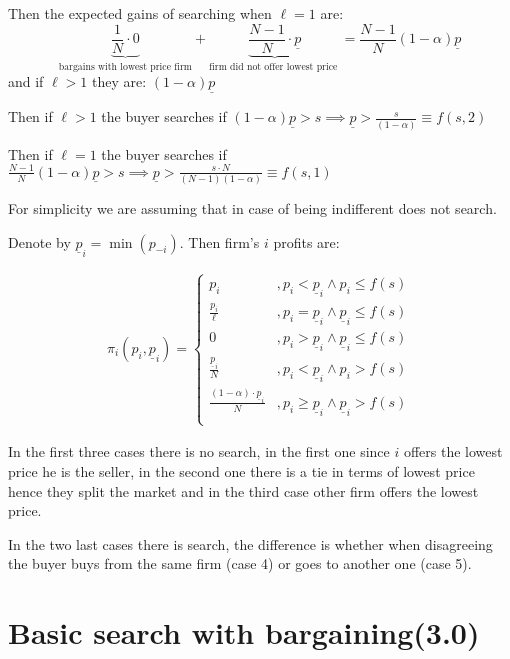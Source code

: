 \documentclass[12pt]{article}
\theoremstyle{plain}
\theoremstyle{plain}
\begin{document}
Then the expected gains of searching when $\ell =1$ are:
\[
\underbrace{\frac{1}{N} \cdot 0}_{\text{bargains with lowest price firm}} + \underbrace{\frac{N - 1}{N} \cdot \underline{p}}_{\text{firm did not offer lowest price }} = \frac{N - 1}{N}(1 - \alpha)\underline{p}
\]
and if $\ell> 1$ they are:  $ (1 - \alpha)\underline{p} $

Then if $\ell>1$ the buyer searches if $ (1 - \alpha)\underline{p}>s \implies \underline{p}>  \frac{s}{(1-\alpha)}\equiv f(s,2)$

Then if $\ell = 1$ the buyer searches if $ \frac{N - 1}{N}(1 - \alpha)\underline{p}>s \implies \underline{p}>  \frac{s\cdot N}{(N-1)(1-\alpha)}\equiv f(s,1)$

For simplicity we are assuming that in case of being indifferent does not search. 

Denote by $\underline{p}_i = \min(p_{-i})$. Then firm's $i$ profits are: 

\begin{align}
    \pi_i(p_i, \underline{p}_i ) = 
    \begin{cases}
        p_i &, p_i < \underline{p}_i \land p_i \leq f(s) \\
        \frac{p_i}{\ell} &, p_i = \underline{p}_i \land \underline{p}_i \leq f(s) \\
        0 &, p_i > \underline{p}_i \land \underline{p}_i  \leq f(s)\\
        \frac{\underline{p}_i }{N} &, p_i < \underline{p}_i \land p_i > f(s) \\
        \frac{(1-\alpha) \cdot \underline{p}_i }{N} &, p_i \geq \underline{p}_i \land \underline{p}_i > f(s)\\      
    \end{cases}
\end{align}

In the first three cases there is no search, in the first one since $i$ offers the lowest price he is the seller, in the second one there is a tie in terms of lowest price hence they split the market and in the third case other firm offers the lowest price. 

In the two last cases there is search, the difference is whether when disagreeing the buyer buys from the same firm (case 4) or goes to another one (case 5). 


\section{Basic search with bargaining(3.0)}
\end{document}
